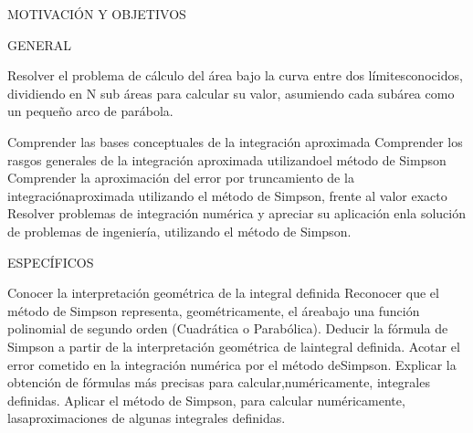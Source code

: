 \documentclass[spanish,a4paper,11pt]{report}
\begin{document}
\newpage

\tableofcontents

\newpage

MOTIVACIÓN Y OBJETIVOS

GENERAL

Resolver el problema de cálculo del área bajo la curva entre dos límitesconocidos, dividiendo en N sub áreas para calcular su valor, asumiendo cada subárea como un pequeño arco de parábola.
 
Comprender las bases conceptuales de la integración aproximada 
Comprender los rasgos generales de la integración aproximada utilizandoel método de Simpson 
Comprender la aproximación del error por truncamiento de la integraciónaproximada utilizando el método de Simpson, frente al valor exacto 
Resolver problemas de integración numérica y apreciar su aplicación enla solución de problemas de ingeniería, utilizando el método de Simpson.

ESPECÍFICOS

 
Conocer la interpretación geométrica de la integral definida
Reconocer que el método de Simpson representa, geométricamente, el áreabajo una función polinomial de segundo orden (Cuadrática o Parabólica).
Deducir la fórmula de Simpson a partir de la interpretación geométrica de laintegral definida.
Acotar el error cometido en la integración numérica por el método deSimpson.
Explicar la obtención de fórmulas más precisas para calcular,numéricamente, integrales definidas.
Aplicar el método de Simpson, para calcular numéricamente, lasaproximaciones de algunas integrales definidas.
\end{document}
